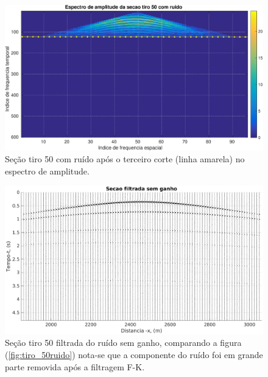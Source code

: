 \begin{landscape}
\begin{figure}[H]
\centering
\includegraphics[totalheight=14cm]{figuras/cap3/espc_tiro50_c3.eps}
\caption{Seção tiro 50 com ruído após o terceiro corte (linha amarela) no espectro de amplitude.}
\label{fig:espc_tiro50_c3}
\end{figure}
\end{landscape}

\begin{landscape}
\begin{figure}[H]
\centering
\includegraphics[totalheight=14cm]{figuras/cap3/secao_filtrada.eps}
\caption{Seção tiro 50 filtrada do ruído sem ganho, comparando a figura (\ref{fig:tiro_50ruido}) nota-se que a componente do ruído foi em grande parte removida após a filtragem F-K.}
\label{fig:secao_filtrada}
\end{figure}
\end{landscape}

